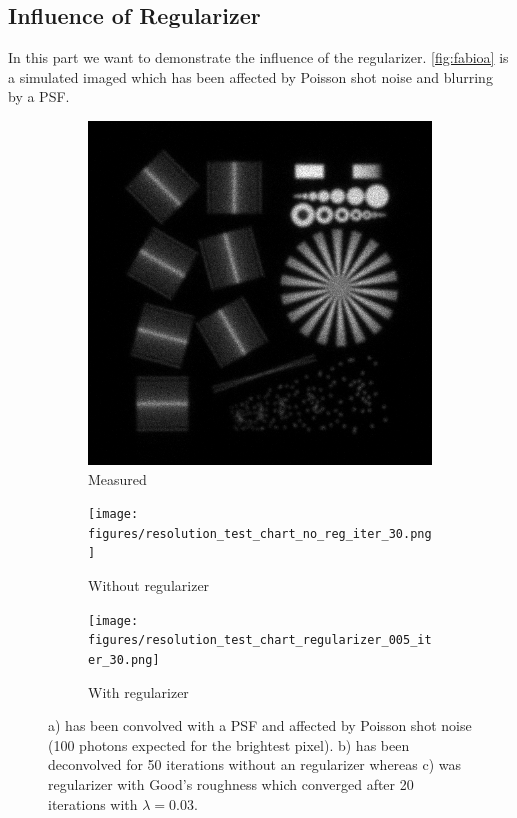 \documentclass{juliacon}
\begin{document}
    \subsection{Influence of Regularizer}
        In this part we want to demonstrate the influence of the regularizer.
        \autoref{fig:fabioa} is a simulated imaged which has been affected by Poisson shot noise and blurring by a PSF.
        \begin{figure}[h]
            \begin{subfigure}[b]{.166\textwidth}
                \centering
                \includegraphics[width=\textwidth]{figures/resolution_test_chart_blurry.png}
                \caption{Measured}
                \label{fig:fabioa}
            \end{subfigure}%
            \begin{subfigure}[b]{.166\textwidth}
                \centering
                \texttt{[image: figures/resolution\_test\_chart\_no\_reg\_iter\_30.png]}
                \caption{Without regularizer}
                \label{fig:fabiob}
            \end{subfigure}%
            \begin{subfigure}[b]{.166\textwidth}
                \centering
                \texttt{[image: figures/resolution\_test\_chart\_regularizer\_005\_iter\_30.png]}
                \caption{With regularizer}
                \label{fig:fabioc}
            \end{subfigure}%
            \caption{a) has been convolved with a PSF and affected by Poisson shot noise (100 photons expected for the brightest pixel). b) has been deconvolved for 50 iterations without an regularizer whereas c) was regularizer with Good's roughness which converged after 20 iterations with $\lambda=0.03$.}
            \label{fig:image}
        \end{figure}
\end{document}
